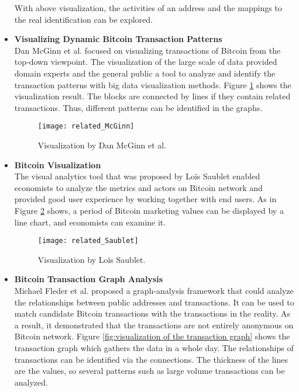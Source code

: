 \begin{itemize}
        With above visualization, the activities of an address and the mappings to the real identification can be explored.
        \clearpage
    \item \textbf{Visualizing Dynamic Bitcoin Transaction Patterns} \cite{McGinn2016} \\
        Dan McGinn et al. focused on visualizing transactions of Bitcoin from the top-down viewpoint. The visualization of the large scale of data provided domain experts and the general public a tool to analyze and identify the transaction patterns with big data visualization methods. Figure \ref{fig:visualization by dan mcGinn et al} \cite{McGinn2016} shows the visualization result. The blocks are connected by lines if they contain related transactions. Thus, different patterns can be identified in the graphs.
        \begin{figure}[htb]
            \centering
            \texttt{[image: related\_McGinn]}
            \caption{Visualization by Dan McGinn et al.}
            \label{fig:visualization by dan mcGinn et al}
        \end{figure}
    \item \textbf{Bitcoin Visualization} \cite{Saublet2015} \\
        The visual analytics tool that was proposed by Loïs Saublet enabled economists to analyze the metrics and actors on Bitcoin network and provided good user experience by working together with end users. As in Figure \ref{fig:visualization by loïs saublet} \cite{Saublet2015} shows, a period of Bitcoin marketing values can be displayed by a line chart, and economists can examine it.
        \begin{figure}[htb]
            \centering
            \texttt{[image: related\_Saublet]}
            \caption{Visualization by Loïs Saublet.}
            \label{fig:visualization by loïs saublet}
        \end{figure}
    \item \textbf{Bitcoin Transaction Graph Analysis} \cite{Fleder2015} \\
        Michael Fleder et al. proposed a graph-analysis framework that could analyze the relationships between public addresses and transactions. It can be used to match candidate Bitcoin transactions with the transactions in the reality. As a result, it demonstrated that the transactions are not entirely anonymous on Bitcoin network. Figure \ref{fig:visualization of the transaction graph} \cite{Fleder2015} shows the transaction graph which gathers the data in a whole day. The relationships of transactions can be identified via the connections. The thickness of the lines are the values, so several patterns such as large volume transactions can be analyzed.

\end{itemize}

